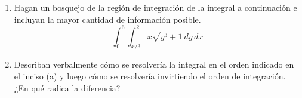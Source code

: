 \begin{ejercicio}
    \begin{enumerate}
    \item[(a)] Hagan un bosquejo de la región de integración de la integral a continuación e incluyan la mayor cantidad de información posible.
    \begin{equation}
        \int_{0}^{6} \int_{x/3}^{2} x\sqrt{y^3 + 1}\, dy\, dx
    \end{equation}
    \item[(b)] Describan verbalmente cómo se resolvería la integral en el orden indicado en el inciso (a) y luego cómo se resolvería invirtiendo el orden de integración. ¿En qué radica la diferencia?
\end{enumerate}
\end{ejercicio}

